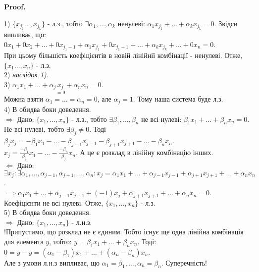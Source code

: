 \documentclass[a4paper, 10pt]{article}
\makeatletter
\def\huge{\displaystyle}
\def\qed{$\blacksquare$}
\def\rightproof{$\boxed{\Rightarrow}$ }
\def\leftproof{$\boxed{\Leftarrow}$ }
\theoremstyle{theoremdd}
\theoremstyle{theoremdd}
\theoremstyle{theoremdd}
\theoremstyle{theoremdd}
\theoremstyle{theoremdd}
\theoremstyle{theoremdd}
\theoremstyle{theoremdd}
\theoremstyle{theoremdd}
\renewenvironment{proof}[1][Proof.\\]{\par
\pushQED{\hfill \qed}%
\normalfont \topsep6\p@\@plus6\p@\relax
\trivlist
\item\relax
{\bfseries
#1\@addpunct{.}}\hspace\labelsep\ignorespaces
}{%
\popQED\endtrivlist\@endpefalse
}
\makeatother
\begin{document}
	\begin{proof}
	1) $\{x_{j_1} \dots, x_{j_k}\}$ - л.з., тобто $\exists \alpha_1, \dots, \alpha_k$ ненулеві: $\alpha_1 x_{j_1} + \dots + \alpha_k x_{j_k} = 0$. Звідси випливає, що:\\
	$0x_1 + 0x_2 + \dots + 0x_{j_1-1} + \alpha_1 x_{j_1} + 0x_{j_1 + 1} + \dots + \alpha_k x_{j_k} + \dots + 0 x_n = 0$.\\
	При цьому більшість коефіцієнтів в новій лінійнії комбінації - ненулеві. Отже, $\{x_1 \dots, x_n\}$ - л.з.
	\bigskip \\
	2) \textit{наслідок 1).}
	\bigskip \\
	3) $\alpha_1 x_1 + \dots + \alpha_j \underset{=0}{x_j} + \alpha_n x_n = 0$.\\
	Можна взяти $\alpha_1 = \dots = \alpha_n = 0$, але $\alpha_j = 1$. Тому наша система буде л.з.
	\bigskip \\
	4) В обидва боки доведення.\\
	\rightproof Дано: $\{x_1, \dots, x_n\}$ - л.з., тобто $\exists \beta_1, \dots, \beta_n$ не всі нулеві: $\beta_1 x_1 + \dots + \beta_n x_n = 0$.\\
	Не всі нулеві, тобто $\exists \beta_j \neq 0$. Тоді
	$\beta_j x_j = -\beta_1 x_1 - \dots - \beta_{j-1} x_{j-1} - \beta_{j+1} x_{j+1} - \dots - \beta_n x_n$.\\
	$\huge x_j = \frac{-\beta_1}{\beta_j}x_1 - \dots - \frac{-\beta_n}{\beta_j}x_n$. А це є розклад в лінійну комбінацію інших.
	\bigskip \\
	\leftproof Дано: $\exists x_j: \exists \alpha_1, \dots, \alpha_{j-1}, \alpha_{j+1}, \dots, \alpha_n: x_j = \alpha_1 x_1 + \dots + \alpha_{j-1} x_{j-1} + \alpha_{j+1} x_{j+1} + \dots + \alpha_n x_n$.\\
	$\implies \alpha_1 x_1 + \dots + \alpha_{j-1} x_{j-1} + (-1)x_j + \alpha_{j+1} x_{j+1} + \dots + \alpha_n x_n = 0$.\\
	Коефіцієнти не всі нулеві. Отже, $\{x_1, \dots, x_n\}$ - л.з.
	\bigskip \\
	5) В обидва боки доведення.\\
	\rightproof Дано: $\{x_1, \dots, x_n \}$ - л.н.з.\\
	!Припустимо, що розклад не є єдиним. Тобто існує ще одна лінійна комбінація для елемента $y$, тобто: $y = \beta_1 x_1 + \dots + \beta_n x_n$. Тоді:\\
	$0 = y - y = (\alpha_1 - \beta_1)x_1 + \dots + (\alpha_n - \beta_n)x_n$.\\
	Але з умови л.н.з випливає, що $\alpha_1 = \beta_1, \dots, \alpha_n = \beta_n$. Суперечність! \\ 

\end{proof}
\end{document}
